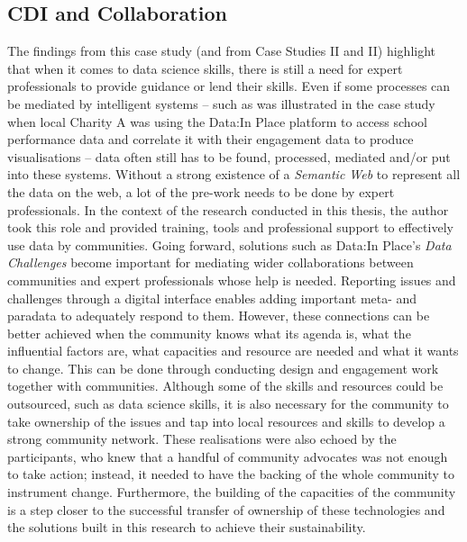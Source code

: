 \subsection{CDI and Collaboration}
The findings from this case study (and from Case Studies II and II) highlight that when it comes to data science skills, there is still a need for expert professionals to provide guidance or lend their skills. Even if some processes can be mediated by intelligent systems -- such as was illustrated in the case study when local Charity A was using the Data:In Place platform to access school performance data and correlate it with their engagement data to produce visualisations -- data often still has to be found, processed, mediated and/or put into these systems. Without a strong existence of a \textit{Semantic Web} to represent all the data on the web, a lot of the pre-work needs to be done by expert professionals. In the context of the research conducted in this thesis, the author took this role and provided training, tools and professional support to effectively use data by communities. Going forward, solutions such as Data:In Place's \textit{Data Challenges} become important for mediating wider collaborations between communities and expert professionals whose help is needed. Reporting issues and challenges through a digital interface enables adding important meta- and paradata to adequately respond to them. However, these connections can be better achieved when the community knows what its agenda is, what the influential factors are, what capacities and resource are needed and what it wants to change. This can be done through conducting design and engagement work together with communities. Although some of the skills and resources could be outsourced, such as data science skills, it is also necessary for the community to take ownership of the issues and tap into local resources and skills to develop a strong community network. These realisations were also echoed by the participants, who knew that a handful of community advocates was not enough to take action; instead, it needed to have the backing of the whole community to instrument change. Furthermore, the building of the capacities of the community is a step closer to the successful transfer of ownership of these technologies and the solutions built in this research to achieve their sustainability.
\newline

